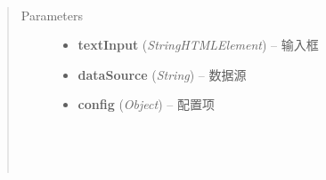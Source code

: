 \documentclass[letterpaper,10pt,english]{sphinxmanual}
\begin{document}
\begin{fulllineitems}
\label{api/component/suggest/suggest:Suggest.KISSY.Suggest}~\begin{quote}\begin{description}
\item[{Parameters}] \leavevmode\begin{itemize}
\item {}
\textbf{textInput} (\emph{String\textbar{}HTMLElement}) -- 输入框

\item {}
\textbf{dataSource} (\emph{String}) -- 数据源

\item {}
\textbf{config} (\emph{Object}) --
配置项


\begin{fulllineitems}
\label{api/component/suggest/suggest:Suggest.KISSY.Suggest.containerCls}~

\end{fulllineitems}



\begin{fulllineitems}
\label{api/component/suggest/suggest:Suggest.KISSY.Suggest.containerWidth}~

\end{fulllineitems}



\end{itemize}

\end{description}\end{quote}

\end{fulllineitems}
\end{document}
